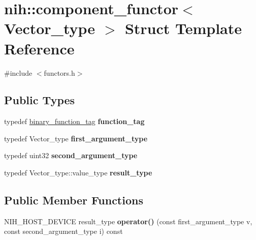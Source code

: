 \hypertarget{structnih_1_1component__functor}{
\section{nih\-:\-:component\-\_\-functor$<$ \-Vector\-\_\-type $>$ \-Struct \-Template \-Reference}
\label{structnih_1_1component__functor}
}


{\ttfamily \#include $<$functors.\-h$>$}

\subsection*{\-Public \-Types}
\begin{DoxyCompactItemize}
\item 
\hypertarget{structnih_1_1component__functor_a6304fe3c6bd234625b4ccf4f4fa0305f}{
typedef \hyperlink{structnih_1_1binary__function__tag}{binary\-\_\-function\-\_\-tag} {\bfseries function\-\_\-tag}}
\label{structnih_1_1component__functor_a6304fe3c6bd234625b4ccf4f4fa0305f}

\item 
\hypertarget{structnih_1_1component__functor_a2d743b17bf03019f398f1552d50434c1}{
typedef \-Vector\-\_\-type {\bfseries first\-\_\-argument\-\_\-type}}
\label{structnih_1_1component__functor_a2d743b17bf03019f398f1552d50434c1}

\item 
\hypertarget{structnih_1_1component__functor_a17b0f12422275fa93ccd888fe5f40a94}{
typedef uint32 {\bfseries second\-\_\-argument\-\_\-type}}
\label{structnih_1_1component__functor_a17b0f12422275fa93ccd888fe5f40a94}

\item 
\hypertarget{structnih_1_1component__functor_ad89bf15dcbf94f6c9dbe742d456f66e1}{
typedef \-Vector\-\_\-type\-::value\-\_\-type {\bfseries result\-\_\-type}}
\label{structnih_1_1component__functor_ad89bf15dcbf94f6c9dbe742d456f66e1}

\end{DoxyCompactItemize}
\subsection*{\-Public \-Member \-Functions}
\begin{DoxyCompactItemize}
\item 
\hypertarget{structnih_1_1component__functor_ac29daa9443e5cee9f254066afb107d9a}{
\-N\-I\-H\-\_\-\-H\-O\-S\-T\-\_\-\-D\-E\-V\-I\-C\-E result\-\_\-type {\bfseries operator()} (const first\-\_\-argument\-\_\-type v, const second\-\_\-argument\-\_\-type i) const }
\label{structnih_1_1component__functor_ac29daa9443e5cee9f254066afb107d9a}

\end{DoxyCompactItemize}


